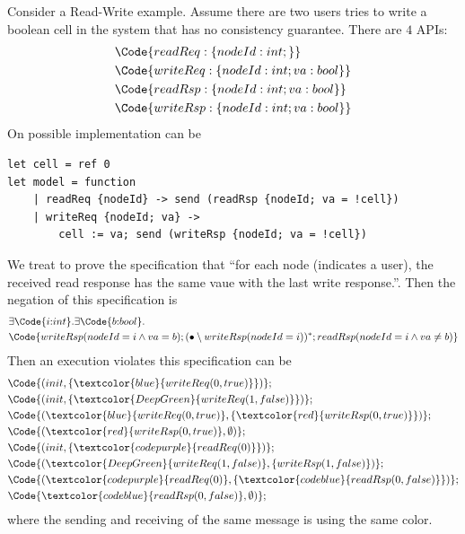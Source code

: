 Consider a Read-Write example. Assume there are two users tries to write a boolean cell in the system that has no consistency guarantee. There are $4$ APIs:
{\footnotesize\begin{align*}
    &\Code{readReq: \{nodeId: int;\}}\\
    &\Code{writeReq: \{nodeId: int; va: bool\}}\\
    &\Code{readRsp: \{nodeId: int; va: bool\}}\\
    &\Code{writeRsp: \{nodeId: int; va: bool\}}
\end{align*}}\noindent
On possible implementation can be
\begin{verbatim}
let cell = ref 0
let model = function
    | readReq {nodeId} -> send (readRsp {nodeId; va = !cell})
    | writeReq {nodeId; va} ->
        cell := va; send (writeRsp {nodeId; va = !cell})
\end{verbatim}
We treat to prove the specification that ``for each node (indicates a user), the received read response has the same vaue with the last write response.''. Then the negation of this specification is
{\footnotesize\begin{align*}
    &\exists \Code{i{:}int}.\exists \Code{b{:}bool}. 
    \\&\Code{writeRsp(nodeId = i \land va = b);(\bullet \setminus writeRsp(nodeId = i))^*;readRsp(nodeId = i \land va \not= b)}
\end{align*}}\noindent
Then an execution violates this specification can be
{\footnotesize\begin{align*}
    &\Code{(init, \{\textcolor{blue}{writeReq(0,true)}\})};
    \\&\Code{(init, \{\textcolor{DeepGreen}{writeReq(1, false)}\})};
    \\&\Code{(\textcolor{blue}{writeReq(0,true)}, \{\textcolor{red}{writeRsp(0,true)}\})};
    \\&\Code{(\textcolor{red}{writeRsp(0,true)}, \emptyset)};
    \\&\Code{(init, \{\textcolor{codepurple}{readReq(0)}\})};
    \\&\Code{(\textcolor{DeepGreen}{writeReq(1, false)}, \{writeRsp(1, false)\})};
    \\&\Code{(\textcolor{codepurple}{readReq(0)}, \{\textcolor{codeblue}{readRsp(0, false)}\})};
    \\&\Code{\textcolor{codeblue}{readRsp(0, false)}, \emptyset)};
\end{align*}}\noindent
where the sending and receiving of the same message is using the same color.

